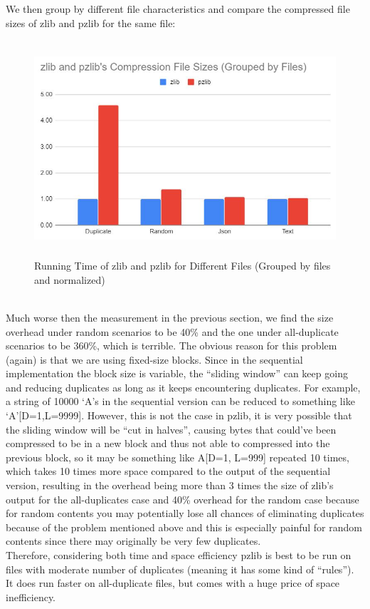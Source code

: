 \documentclass[12pt]{article}
\begin{document}
    We then group by different file characteristics and compare the compressed file sizes of zlib and pzlib for the same file:
    \newpage
    \begin{figure}[!h]
    \begin{center}
    \includegraphics[height=8cm]{CompressionSizeFileChars2.JPG}
    \caption{Running Time of zlib and pzlib for Different Files (Grouped by files and normalized)}
    \end{center}
    \end{figure}
    ~\\
    Much worse then the measurement in the previous section, we find the size overhead under random scenarios to be 40\% and the one under all-duplicate scenarios to be 360\%, which is terrible. The obvious reason for this problem (again) is that we are using fixed-size blocks. Since in the sequential implementation the block size is variable, the ``sliding window'' can keep going and reducing duplicates as long as it keeps encountering duplicates. For example, a string of 10000 `A's in the sequential version can be reduced to something like `A'[D=1,L=9999]. However, this is not the case in pzlib, it is very possible that the sliding window will be ``cut in halves'', causing bytes that could've been compressed to be in a new block and thus not able to compressed into the previous block, so it may be something like A[D=1, L=999] repeated 10 times, which takes 10 times more space compared to the output of the sequential version, resulting in the overhead being more than 3 times the size of zlib's output for the all-duplicates case and 40\% overhead for the random case because for random contents you may potentially lose all chances of eliminating duplicates because of the problem mentioned above and this is especially painful for random contents since there may originally be very few duplicates.\\
    Therefore, considering both time and space efficiency pzlib is best to be run on files with moderate number of duplicates (meaning it has some kind of ``rules''). It does run faster on all-duplicate files, but comes with a huge price of space inefficiency.
\end{document}
